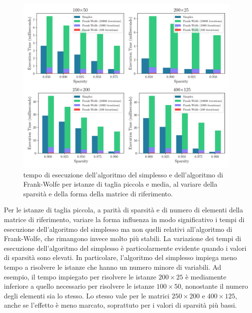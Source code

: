 \begin{figure}[!ht]
    \centering
    \includegraphics[width=\textwidth]{assets/figures/timeshape.pdf}
    \caption{tempo di esecuzione dell'algoritmo del simplesso e dell'algoritmo di Frank-Wolfe per istanze di taglia
    piccola e media, al variare della sparsità e della forma della matrice di riferimento.}
    \label{fig:timeshape}
\end{figure}

Per le istanze di taglia piccola, a parità di sparsità e di numero di elementi della matrice di riferimento, variare la
forma influenza in modo significativo i tempi di esecuzione dell'algoritmo del simplesso ma non quelli relativi
all'algoritmo di Frank-Wolfe, che rimangono invece molto più stabili. La variazione dei tempi di esecuzione
dell'algoritmo del simplesso è particolarmente evidente quando i valori di sparsità sono elevati. In particolare,
l'algoritmo del simplesso impiega meno tempo a risolvere le istanze che hanno un numero minore di variabili. Ad esempio,
il tempo impiegato per risolvere le istanze \( 200\times 25 \) è mediamente inferiore a quello necessario per risolvere
le istanze  \( 100\times 50 \), nonostante il numero degli elementi sia lo stesso. Lo stesso vale per le matrici \(
250\times 200 \) e  \( 400\times 125 \), anche se l'effetto è meno marcato, soprattuto per i valori di sparsità più
bassi.

